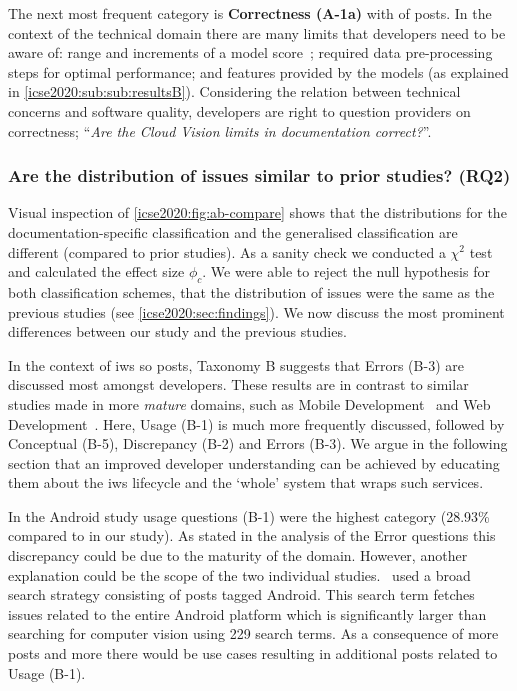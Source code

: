 The next most frequent category is \textbf{Correctness (A-1a)} with \PctTaxACorrectness{} of posts. In the context of the technical domain there are many limits that developers need to be aware of: range and increments of a model score~\citep{Cummaudo:2019icsme}; required data pre-processing steps for optimal performance; and features provided by the models (as explained in \cref{icse2020:sub:sub:resultsB}). Considering the relation between technical concerns and software quality, developers are right to question providers on correctness; ``\textit{Are the Cloud Vision  limits in documentation correct?}''.

\subsubsection{Are the distribution of issues similar to prior studies? (RQ2)}
Visual inspection of \cref{icse2020:fig:ab-compare} shows that the distributions for the documentation-specific classification and the generalised classification are different (compared to prior studies). As a sanity check we conducted a $\chi^2$ test and calculated the effect size $\phi_c$. We were able to reject the null hypothesis for both classification schemes, that the distribution of issues were the same as the previous studies (see \cref{icse2020:sec:findings}). We now discuss the most prominent differences between our study and the previous studies.

%
%

%
%

%

In the context of \gls{iws} \gls{so} posts, Taxonomy B suggests that Errors (B-3) are discussed most amongst developers. These results are in contrast to similar studies made in more \textit{mature}  domains, such as Mobile Development~\citep{Beyer:2018fm,Beyer:2014ec,Rosen:2016uk, Barnett:2015ec, Barnett:2015ut} and Web Development~\citep{Treude:2011fh}. Here,  Usage (B-1) is much more frequently discussed, followed by Conceptual (B-5), Discrepancy (B-2) and Errors (B-3). We argue in the following section that an improved developer understanding can be achieved by educating them about the \gls{iws} lifecycle and the `whole' system that wraps such services.

In the Android study  usage questions (B-1) were the highest category (28.93\% compared to \PctTaxBAPIUsage{} in our study). As stated in the analysis of the Error questions this discrepancy could be due to the maturity of the domain. However, another explanation could be the scope of the two individual studies.~\citet{Beyer:2018fm} used a broad search strategy consisting of posts tagged Android. This search term fetches issues related to the entire Android platform which is significantly larger than searching for computer vision  using 229 search terms. As a consequence of more posts and more  there would be use cases resulting in additional posts related to  Usage (B-1).

